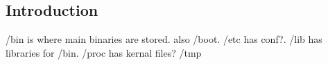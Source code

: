 
\subsection{Introduction}
 
/bin is where main binaries are stored. also /boot. /etc has conf?. /lib has libraries for /bin. /proc has kernal files? /tmp